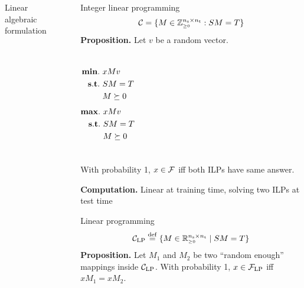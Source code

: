 \documentclass[final,table]{beamer}
\newlength{\sepwid}
\newlength{\onecolwid}
\begin{document}
\begin{frame}[t]
\begin{columns}[t]
\begin{column}{\onecolwid}
\begin{block}{Linear algebraic formulation}



\end{block}

\end{column} %
\begin{column}{\sepwid}\end{column} %
\begin{column}{\onecolwid} %




\begin{block}{Integer linear programming}
\begin{align*}
  \mathcal{C} = \{ M \in \mathbb{Z}_{\scriptscriptstyle\geq0}^{n_\text{s} \times n_\text{t}} : SM = T \}
\end{align*}
{\bf Proposition.}
Let $v$ be a random vector.
\vspace{-2cm}
\begin{columns}[t]
	\centering
	\begin{align*}
	{\bf min.} &\ xMv \\
	{\bf s.t.} &\ SM=T\\
	&\ M \succeq 0
	\end{align*}
	\centering
	\begin{align*}
	{\bf max.} &\ xMv \\
	{\bf s.t.} &\ SM=T\\
	&\ M \succeq 0
	\end{align*}
\end{columns}
With probability 1, $x \in \mathcal{F}$ iff both ILPs have same answer.

{\bf Computation. } Linear at training time, solving two ILPs at test time
\end{block}


\begin{block}{Linear programming}
\begin{align*}
\label{eqn:consistentLP}
\mathcal{C}_\text{\rm LP} &\stackrel{\rm def}{=} \{ M \in \mathbb{R}_{\scriptscriptstyle\geq0}^{n_\text{s} \times n_\text{t}} \mid S M = T \} \\
\end{align*}
{\bf Proposition.}
	\label{prop:projection}
Let $M_1$ and $M_2$ be two ``random enough'' mappings inside $\mathcal{C}_\text{\rm LP}$.
With probability 1, $x \in \mathcal{F}_\text{\rm LP}$ iff $x M_1 = x M_2$.


\end{block}
\end{column}
\end{columns}
\end{frame}
\end{document}
